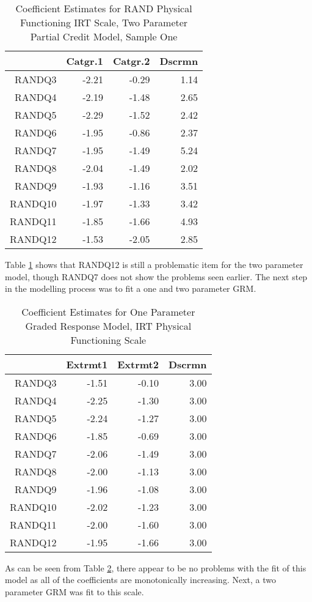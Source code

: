\documentclass{article}
\begin{document}
\clearpage

\begin{table}[ht]
\centering
\begin{tabular}{rrrr}
  \hline
 & Catgr.1 & Catgr.2 & Dscrmn \\ 
  \hline
RANDQ3 & -2.21 & -0.29 & 1.14 \\ 
  RANDQ4 & -2.19 & -1.48 & 2.65 \\ 
  RANDQ5 & -2.29 & -1.52 & 2.42 \\ 
  RANDQ6 & -1.95 & -0.86 & 2.37 \\ 
  RANDQ7 & -1.95 & -1.49 & 5.24 \\ 
  RANDQ8 & -2.04 & -1.49 & 2.02 \\ 
  RANDQ9 & -1.93 & -1.16 & 3.51 \\ 
  RANDQ10 & -1.97 & -1.33 & 3.42 \\ 
  RANDQ11 & -1.85 & -1.66 & 4.93 \\ 
  RANDQ12 & -1.53 & -2.05 & 2.85 \\ 
   \hline
\end{tabular}
\caption{Coefficient Estimates for RAND Physical Functioning IRT Scale, Two Parameter Partial Credit Model, Sample One} 
\label{tab:randphysfungpcm}
\end{table}
Table \ref{tab:randphysfungpcm} shows that RANDQ12 is still a problematic item for the two parameter model, though RANDQ7 does not show the problems seen earlier. The next step in the modelling process was to fit a one and two parameter GRM.  




\begin{table}[ht]
\centering
\begin{tabular}{rrrr}
  \hline
 & Extrmt1 & Extrmt2 & Dscrmn \\ 
  \hline
RANDQ3 & -1.51 & -0.10 & 3.00 \\ 
  RANDQ4 & -2.25 & -1.30 & 3.00 \\ 
  RANDQ5 & -2.24 & -1.27 & 3.00 \\ 
  RANDQ6 & -1.85 & -0.69 & 3.00 \\ 
  RANDQ7 & -2.06 & -1.49 & 3.00 \\ 
  RANDQ8 & -2.00 & -1.13 & 3.00 \\ 
  RANDQ9 & -1.96 & -1.08 & 3.00 \\ 
  RANDQ10 & -2.02 & -1.23 & 3.00 \\ 
  RANDQ11 & -2.00 & -1.60 & 3.00 \\ 
  RANDQ12 & -1.95 & -1.66 & 3.00 \\ 
   \hline
\end{tabular}
\caption{Coefficient Estimates for One Parameter Graded Response Model, IRT Physical Functioning Scale} 
\label{tab:physfungrm1}
\end{table}
As can be seen from Table \ref{tab:physfungrm1}, there appear to be no problems with the fit of this model as all of the coefficients are monotonically increasing. Next, a two parameter GRM was fit to this scale. 
\end{document}
